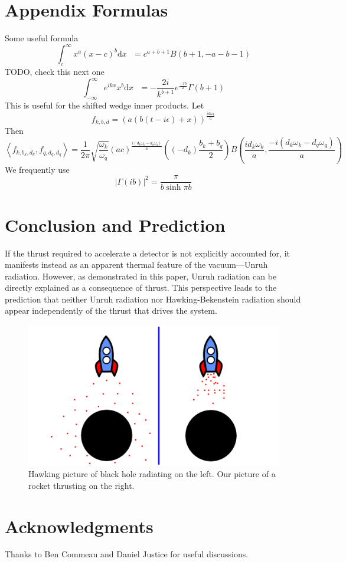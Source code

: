 \documentclass[12pt,a4paper]{article}
\newcommand{\dv}[1]{\mathrm{d} #1 \text{ }}
\begin{document}
\section{Appendix Formulas}
Some useful formula
\begin{equation}
  \int_{c}^\infty x^a (x-c)^b \dv{x} = c^{a+b+1} B(b+1, -a-b-1)
\end{equation}
TODO, check this next one
\begin{equation}
  \int_{-\infty}^\infty e^{ikx} x^b \dv{x} = -\frac{2i}{k^{b+1}} e^{\frac{-\pi b}{2}} \Gamma(b+1)
\end{equation}
This is useful for the shifted wedge inner products. Let
\begin{equation}
  f_{k,b,d} = \left(a\left(b(t-i\epsilon)+x\right)\right)^\frac{id\omega_k}{a}
\end{equation}
Then
\begin{equation}
  \left< f_{k,b_k,d_k}, f_{q,d_q,d_q}\right> = \frac{1}{2\pi} \sqrt{\frac{\omega_k}{\omega_q}} (ac)^\frac{i(d_k\omega_k - d_q \omega_q)}{a} \left((-d_k)\frac{b_k + b_q}{2} \right) B\left(\frac{id_k\omega_k}{a}, \frac{-i(d_k\omega_k - d_q \omega_q)}{a}\right)
\end{equation}
We frequently use
\begin{equation}
  |\Gamma(ib)|^2 = \frac{\pi}{b \sinh \pi b}
\end{equation}


\section{Conclusion and Prediction}
If the thrust required to accelerate a detector is not explicitly accounted for, it manifests instead as an apparent thermal feature of the vacuum—Unruh radiation. However, as demonstrated in this paper, Unruh radiation can be directly explained as a consequence of thrust. This perspective leads to the prediction that neither Unruh radiation nor Hawking-Bekenstein radiation should appear independently of the thrust that drives the system.

\begin{figure}[h]
\centering
\includegraphics[scale=0.5]{rocket.png}
\caption{Hawking picture of black hole radiating on the left. Our picture of a rocket thrusting on the right.}
\label{rocket}
\end{figure}

\section{Acknowledgments}
Thanks to Ben Commeau and Daniel Justice for useful discussions.



\end{document}
